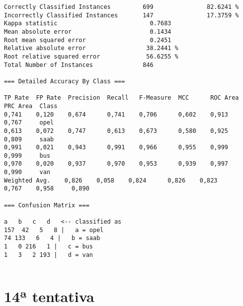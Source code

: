 \documentclass[
	article,			%
	11pt,				%
	oneside,			%
	a4paper,			%
	english,			%
	brazil,				%
	sumario=tradicional
	]{abntex2}
\begin{document}
\begin{lstlisting}
Correctly Classified Instances         699               82.6241 %
Incorrectly Classified Instances       147               17.3759 %
Kappa statistic                          0.7683
Mean absolute error                      0.1434
Root mean squared error                  0.2451
Relative absolute error                 38.2441 %
Root relative squared error             56.6255 %
Total Number of Instances              846     

=== Detailed Accuracy By Class ===

TP Rate  FP Rate  Precision  Recall   F-Measure  MCC      ROC Area  PRC Area  Class
0,741    0,120    0,674      0,741    0,706      0,602    0,913     0,767     opel
0,613    0,072    0,747      0,613    0,673      0,580    0,925     0,809     saab
0,991    0,021    0,943      0,991    0,966      0,955    0,999     0,999     bus
0,970    0,020    0,937      0,970    0,953      0,939    0,997     0,990     van
Weighted Avg.    0,826    0,058    0,824      0,826    0,823      0,767    0,958     0,890     

=== Confusion Matrix ===

a   b   c   d   <-- classified as
157  42   5   8 |   a = opel
74 133   6   4 |   b = saab
1   0 216   1 |   c = bus
1   3   2 193 |   d = van


\end{lstlisting}

\newpage

\section{14ª tentativa}
\end{document}
